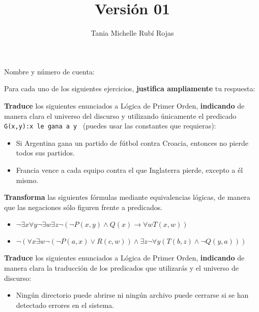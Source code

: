 \documentclass[oneside]{style}
\title{Versión 01}
\author{Tania Michelle Rubí Rojas}
\begin{document}
\maketitle

\vspace{5mm}
\noindent
Nombre y número de cuenta: \hrulefill\

\vspace*{5mm}
Para cada uno de los siguientes ejercicios, \textbf{justifica ampliamente} tu 
respuesta:

\begin{questions}[label=\protect\circled{\bfseries\arabic*}]

    \question
    {
        \textbf{Traduce} los siguientes enunciados a Lógica de Primer Orden, 
        \textbf{indicando} de manera clara el universo del discurso y 
        utilizando únicamente el predicado \texttt{G(x,y):x le gana a y } 
        (puedes usar las constantes que requieras): 
        \begin{itemize}
            \item Si Argentina gana un partido de fútbol contra Croacia, 
            entonces no pierde todos sus partidos. 

            \item Francia vence a cada equipo contra el que Inglaterra 
            pierde, excepto a él mismo. 
        \end{itemize}
    }    
    
    \question
    {
        \textbf{Transforma} las siguientes fórmulas mediante equivalencias 
        lógicas, de manera que las negaciones sólo figuren frente a predicados.
        \begin{itemize}
            \item $\neg \exists x \forall y \neg \exists w \exists z \neg 
            (\neg P(x,y) \land Q(x) \rightarrow \forall w T(x,w))$

            \item $\neg (\forall x \exists w \neg (\neg P(a,x) \lor 
            R(c,w)) \land \exists z \neg \forall y (T(b,z) \land 
            \neg Q(y,a)))$
        \end{itemize}
    }

     \question
     {
         \textbf{Traduce} los siguientes enunciados a Lógica de Primer Orden, 
         \textbf{indicando} de manera clara la traducción de los predicados 
         que utilizarás y el universo de discurso:
         \begin{itemize}
            \item Ningún directorio puede abrirse ni ningún archivo puede 
            cerrarse si se han detectado errores en el sistema. 


\end{itemize}}
\end{questions}
\end{document}
